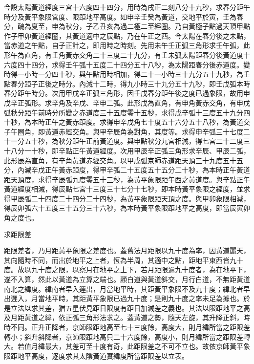 \begin{pinyinscope}
今設太陽黃道經度三宮十六度四十四分，用時為戌正二刻八分十九秒，求春分距午時分及黃平象限宮度、限距地平高度。如申辛壬癸為黃道，交地平於寅，壬為春分，醜為夏至，申為秋分，子乙丑亥為過二極二至經圈。乃自黃極子點過天頂甲點作子甲卯黃道經圈，其黃道適中之辰點，乃在午正之西。今太陽在春分後之未點，當赤道之午點，自子正計之，即用時之時刻。先用未午壬正弧三角形求壬午弧，此形午為直角，有壬角黃赤交角二十三度二十九分，有壬未弧太陽距春分後黃道度十六度四十四分，求得壬午弧十五度二十四分五十八秒，為太陽距春分後赤道度。變時得一小時一分四十秒，與午點用時相加，得二十一小時三十九分五十九秒，為壬點春分距子正後之時分。內減十二時，得九小時三十九分五十九秒，即壬戊弧本時春分距午時分。次用甲戊辛正弧三角形，因壬戊春分距午後之度已過象限，故用申戊辛正弧形。求辛角及辛戊、辛申二弧。此形戊為直角，有申角黃赤交角，有申戊弧秋分距午前時分所變之赤道度三十五度零十五秒，求得戊辛弧十三度五十九分四十秒，為本時正午之黃赤距度。求得申辛戊角七十度五十六分五十八秒，為黃道交子午圈角，即黃道赤經交角。與甲辛辰角為對角，其度等。求得申辛弧三十七度二十一分五十秒，為秋分距午正前黃道度。與申點秋分九宮相減，得七宮二十二度三十八分一十秒，即辛點正午黃道經度。次用甲辰辛正弧三角形求辛辰、甲辰二弧，此形辰為直角，有辛角黃道赤經交角。以甲戊弧京師赤道距天頂三十九度五十五分，內減辛戊正午黃赤距度，得甲辛弧二十五度五十五分二十秒，為本時正午黃道距天頂度，求得辛辰弧九度零五十三秒，為黃平象限距午西之黃道度。與辛點正午黃道經度相減，得辰點七宮十三度三十七分十七秒，即本時黃平象限之經度，並求得甲辰弧二十四度二十四分二十四秒，為黃平象限距天頂之度。與甲卯象限相減，得辰卯弧六十五度三十五分三十六秒，為本時黃平象限距地平之高度，即當辰寅卯角之度也。

求距限差

距限差者，乃月距黃平象限之差度也。蓋舊法月距限以九十度為率，因黃道麗天，其向隨時不同，而出於地平之上者，恆為半周，其適中之點，距地平東西皆九十度。故以九十度之限，以察月在地平之上下，若月距限逾九十度者，為在地平下，遂不入算，然此以黃道為立算之端也。顧白道與黃道斜交，月行白道，不無距黃道南北之緯度。緯南者早入遲出，月當地平時，其距黃平象限不及九十度；緯北者早出遲入，月當地平時，其距黃平象限已過九十度；是則九十度之率未足為據也。於是立法以求其差，猶五星伏見距日限度有距日加減差之義也。其法以限距地平之高及月距黃道之緯，依正弧三角形法求之。蓋黃道之勢，隨天左旋，其升降正斜，時時不同。正升正降者，京師限距地高至七十三度餘，高度大，則月緯所當之距限差轉小；斜升斜降者，京師限距地高只二十六度餘，高度小，則月緯所當之距限差轉大。若值月緯最大，其差可至十度有奇，此距限差之不可不立也。故依京師黃平象限距地平高度，逐度求其太陰黃道實緯度所當距限差以立表。


\end{pinyinscope}

